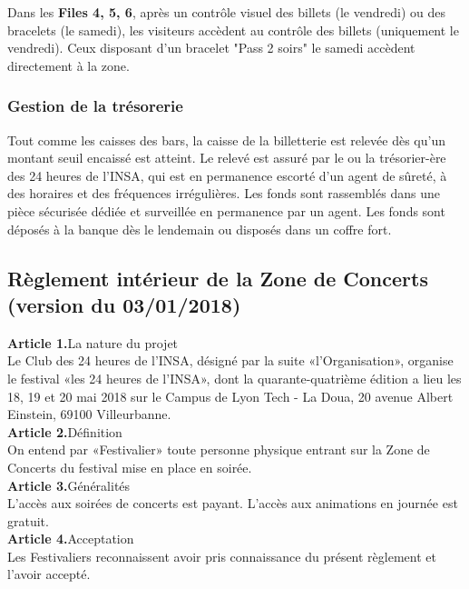 \documentclass[hidelinks, paper=a4, fontsize=13pt]{report}
\begin{document}
Dans les \textbf{Files 4, 5, 6}, après un contrôle visuel des billets (le vendredi) ou des bracelets (le samedi), les visiteurs accèdent au contrôle des billets (uniquement le vendredi). Ceux disposant d'un bracelet "Pass 2 soirs" le samedi accèdent directement à la zone.


\subsubsection{Gestion de la trésorerie}
Tout comme les caisses des bars, la caisse de la billetterie est relevée dès qu’un montant seuil encaissé est atteint. Le relevé est assuré par le ou la trésorier-ère des 24 heures de l'INSA, qui est en permanence escorté d’un agent de sûreté, à des horaires et des fréquences irrégulières. Les fonds sont rassemblés dans une pièce sécurisée dédiée et surveillée en permanence par un agent. Les fonds sont déposés à la banque dès le lendemain ou disposés dans un coffre fort. 

\newpage 

\subsection{Règlement intérieur de la Zone de Concerts (version du 03/01/2018)}


\textbf{Article 1.}\hspace{3mm}La nature du projet\\
Le Club des 24 heures  de l’INSA, désigné par la suite «l’Organisation», organise le festival «les 24 heures de l’INSA», dont la quarante-quatrième édition a lieu les 18, 19 et 20 mai 2018 sur le Campus de Lyon Tech - La Doua, 20 avenue Albert Einstein, 69100 Villeurbanne.\\


\textbf{Article 2.}\hspace{3mm}Définition\\
On entend par «Festivalier» toute personne physique entrant sur la Zone de Concerts du festival mise en place en soirée.\\


\textbf{Article 3.}\hspace{3mm}Généralités\\
L’accès aux soirées de concerts est payant. L’accès aux animations en journée est gratuit.\\


\textbf{Article 4.}\hspace{3mm}Acceptation\\
Les Festivaliers reconnaissent avoir pris connaissance du présent règlement et l'avoir accepté.\\
\end{document}
